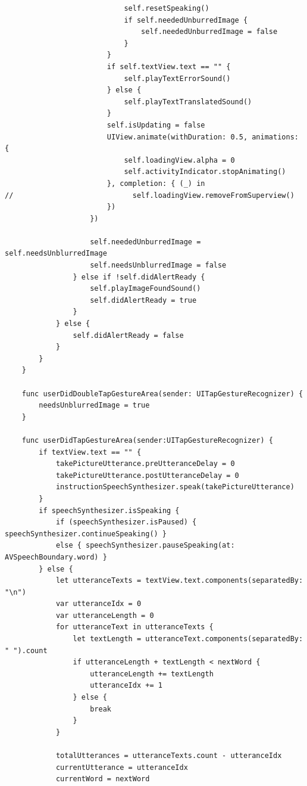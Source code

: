\begin{lstlisting}
                            self.resetSpeaking()
                            if self.neededUnburredImage {
                                self.neededUnburredImage = false
                            }
                        }
                        if self.textView.text == "" {
                            self.playTextErrorSound()
                        } else {
                            self.playTextTranslatedSound()
                        }
                        self.isUpdating = false
                        UIView.animate(withDuration: 0.5, animations: { 
                            self.loadingView.alpha = 0
                            self.activityIndicator.stopAnimating()
                        }, completion: { (_) in
//                            self.loadingView.removeFromSuperview()
                        })
                    })
                    
                    self.neededUnburredImage = self.needsUnblurredImage
                    self.needsUnblurredImage = false
                } else if !self.didAlertReady {
                    self.playImageFoundSound()
                    self.didAlertReady = true
                }
            } else {
                self.didAlertReady = false
            }
        }
    }
    
    func userDidDoubleTapGestureArea(sender: UITapGestureRecognizer) {
        needsUnblurredImage = true
    }
    
    func userDidTapGestureArea(sender:UITapGestureRecognizer) {
        if textView.text == "" {
            takePictureUtterance.preUtteranceDelay = 0
            takePictureUtterance.postUtteranceDelay = 0
            instructionSpeechSynthesizer.speak(takePictureUtterance)
        }
        if speechSynthesizer.isSpeaking {
            if (speechSynthesizer.isPaused) { speechSynthesizer.continueSpeaking() }
            else { speechSynthesizer.pauseSpeaking(at: AVSpeechBoundary.word) }
        } else {
            let utteranceTexts = textView.text.components(separatedBy: "\n")
            var utteranceIdx = 0
            var utteranceLength = 0
            for utteranceText in utteranceTexts {
                let textLength = utteranceText.components(separatedBy: " ").count
                if utteranceLength + textLength < nextWord {
                    utteranceLength += textLength
                    utteranceIdx += 1
                } else {
                    break
                }
            }
            
            totalUtterances = utteranceTexts.count - utteranceIdx
            currentUtterance = utteranceIdx
            currentWord = nextWord
            

\end{lstlisting}
